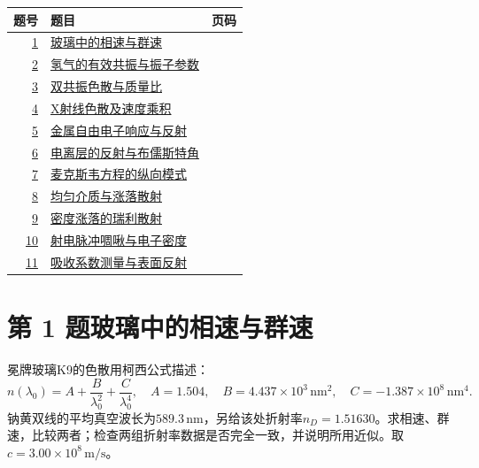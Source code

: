\documentclass[UTF8,fontset=fandol,a4paper,11pt]{ctexart}
\begin{document}
\begin{longtable}{@{}r p{113mm} r@{}}\toprule 题号 & 题目 & 页码\\\midrule

\hyperref[q:1]{1} & \hyperref[q:1]{玻璃中的相速与群速} & \pageref{q:1} \\

\hyperref[q:2]{2} & \hyperref[q:2]{氢气的有效共振与振子参数} & \pageref{q:2} \\

\hyperref[q:3]{3} & \hyperref[q:3]{双共振色散与质量比} & \pageref{q:3} \\

\hyperref[q:4]{4} & \hyperref[q:4]{X射线色散及速度乘积} & \pageref{q:4} \\

\hyperref[q:5]{5} & \hyperref[q:5]{金属自由电子响应与反射} & \pageref{q:5} \\

\hyperref[q:6]{6} & \hyperref[q:6]{电离层的反射与布儒斯特角} & \pageref{q:6} \\

\hyperref[q:7]{7} & \hyperref[q:7]{麦克斯韦方程的纵向模式} & \pageref{q:7} \\

\hyperref[q:8]{8} & \hyperref[q:8]{均匀介质与涨落散射} & \pageref{q:8} \\

\hyperref[q:9]{9} & \hyperref[q:9]{密度涨落的瑞利散射} & \pageref{q:9} \\

\hyperref[q:10]{10} & \hyperref[q:10]{射电脉冲啁啾与电子密度} & \pageref{q:10} \\

\hyperref[q:11]{11} & \hyperref[q:11]{吸收系数测量与表面反射} & \pageref{q:11} \\

\bottomrule\end{longtable}

\clearpage


\section*{第 1 题\quad 玻璃中的相速与群速}\label{q:1}

冕牌玻璃K9的色散用柯西公式描述：
\[
n(\lambda_0)=A+\frac B{\lambda_0^2}+\frac C{\lambda_0^4},
\quad A=1.504,\quad B=4.437\times10^3\,\mathrm{nm^2},\quad C=-1.387\times10^8\,\mathrm{nm^4}.
\]
钠黄双线的平均真空波长为$589.3\,\mathrm{nm}$，另给该处折射率$n_D=1.51630$。求相速、群速，比较两者；检查两组折射率数据是否完全一致，并说明所用近似。取$c=3.00\times10^8\,\mathrm{m/s}$。
\end{document}
